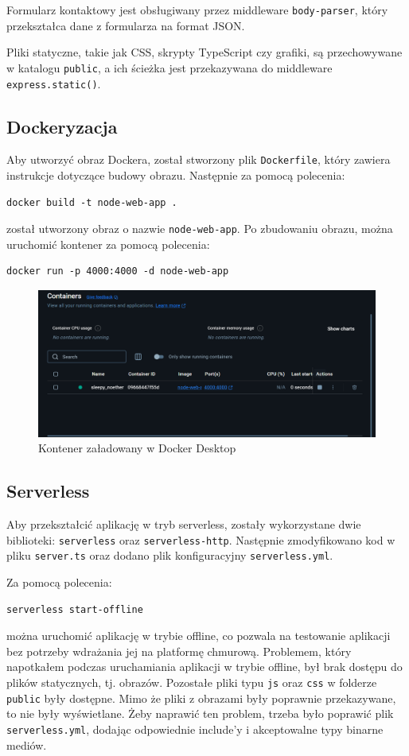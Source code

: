 \documentclass[a4paper,12pt]{article}
\begin{document}
Formularz kontaktowy jest obsługiwany przez middleware \texttt{body-parser}, który przekształca dane z formularza na format JSON.

Pliki statyczne, takie jak CSS, skrypty TypeScript czy grafiki, są przechowywane w katalogu \texttt{public}, a ich ścieżka jest przekazywana do middleware \texttt{express.static()}.

\subsection{Dockeryzacja}
Aby utworzyć obraz Dockera, został stworzony plik \texttt{Dockerfile}, który zawiera instrukcje dotyczące budowy obrazu. Następnie za pomocą polecenia:
\begin{lstlisting}[columns=fullflexible]
docker build -t node-web-app .
\end{lstlisting}
został utworzony obraz o nazwie \texttt{node-web-app}. Po zbudowaniu obrazu, można uruchomić kontener za pomocą polecenia:
\begin{lstlisting}[columns=fullflexible]
docker run -p 4000:4000 -d node-web-app
\end{lstlisting}

\begin{figure}[H]
    \centering
    \includegraphics[width=1\textwidth]{images/docker.png}
    \caption{Kontener załadowany w Docker Desktop}
\end{figure}

\subsection{Serverless}
Aby przekształcić aplikację w tryb serverless, zostały wykorzystane dwie biblioteki: \texttt{serverless} oraz \texttt{serverless-http}. Następnie zmodyfikowano kod w pliku \texttt{server.ts} oraz dodano plik konfiguracyjny \texttt{serverless.yml}.

Za pomocą polecenia:
\begin{lstlisting}[columns=fullflexible]
serverless start-offline
\end{lstlisting}
można uruchomić aplikację w trybie offline, co pozwala na testowanie aplikacji bez potrzeby wdrażania jej na platformę chmurową. Problemem, który napotkałem podczas uruchamiania aplikacji w trybie offline, był brak dostępu do plików statycznych, tj. obrazów. Pozostałe pliki typu \texttt{js} oraz \texttt{css} w folderze \texttt{public} były dostępne. Mimo że pliki z obrazami były poprawnie przekazywane, to nie były wyświetlane. Żeby naprawić ten problem, trzeba było poprawić plik \texttt{serverless.yml}, dodając odpowiednie include'y i akceptowalne typy binarne mediów.
\end{document}
